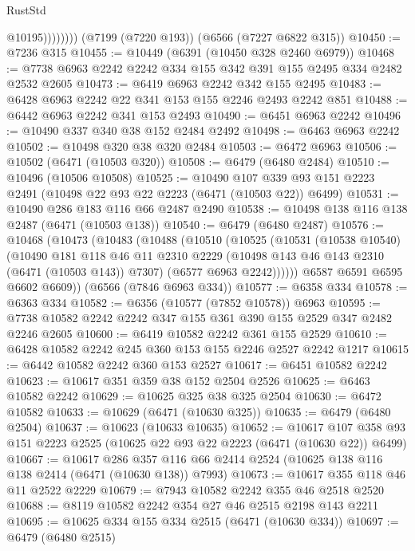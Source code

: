 \begin{lexlean}{RustStd}
\begin{coremodule}
{\begin{coremodule}
{{{{{{{{{{{{{{{{{{{{{{{{{{                    @10195))))))))
    (@7199 (@7220 @193))
    (@6566 (@7227 @6822 @315))
@10450 := @7236 @315
@10455 := @10449 (@6391 (@10450 @328 @2460 @6979))
@10468 := @7738 @6963 @2242 @2242 @334 @155 @342 @391 @155 @2495 @334 @2482 @2532 @2605
@10473 := @6419 @6963 @2242 @342 @155 @2495
@10483 := @6428 @6963 @2242 @22 @341 @153 @155 @2246 @2493 @2242 @851
@10488 := @6442 @6963 @2242 @341 @153 @2493
@10490 := @6451 @6963 @2242
@10496 := @10490 @337 @340 @38 @152 @2484 @2492
@10498 := @6463 @6963 @2242
@10502 := @10498 @320 @38 @320 @2484
@10503 := @6472 @6963
@10506 := @10502 (@6471 (@10503 @320))
@10508 := @6479 (@6480 @2484)
@10510 := @10496 (@10506 @10508)
@10525 := @10490
    @107
    @339
    @93
    @151
    @2223
    @2491
    (@10498 @22 @93 @22 @2223 (@6471 (@10503 @22)) @6499)
@10531 := @10490 @286 @183 @116 @66 @2487 @2490
@10538 := @10498 @138 @116 @138 @2487 (@6471 (@10503 @138))
@10540 := @6479 (@6480 @2487)
@10576 := @10468
    (@10473
      (@10483
        (@10488
          (@10510
            (@10525
              (@10531
                (@10538 @10540)
                (@10490
                  @181
                  @118
                  @46
                  @11
                  @2310
                  @2229
                  (@10498 @143 @46 @143 @2310 (@6471 (@10503 @143)) @7307)
                  (@6577 @6963 @2242))))))
        @6587
        @6591
        @6595
        @6602
        @6609))
    (@6566 (@7846 @6963 @334))
@10577 := @6358 @334
@10578 := @6363 @334
@10582 := @6356 (@10577 (@7852 @10578)) @6963
@10595 := @7738 @10582 @2242 @2242 @347 @155 @361 @390 @155 @2529 @347 @2482 @2246 @2605
@10600 := @6419 @10582 @2242 @361 @155 @2529
@10610 := @6428 @10582 @2242 @245 @360 @153 @155 @2246 @2527 @2242 @1217
@10615 := @6442 @10582 @2242 @360 @153 @2527
@10617 := @6451 @10582 @2242
@10623 := @10617 @351 @359 @38 @152 @2504 @2526
@10625 := @6463 @10582 @2242
@10629 := @10625 @325 @38 @325 @2504
@10630 := @6472 @10582
@10633 := @10629 (@6471 (@10630 @325))
@10635 := @6479 (@6480 @2504)
@10637 := @10623 (@10633 @10635)
@10652 := @10617
    @107
    @358
    @93
    @151
    @2223
    @2525
    (@10625 @22 @93 @22 @2223 (@6471 (@10630 @22)) @6499)
@10667 := @10617
    @286
    @357
    @116
    @66
    @2414
    @2524
    (@10625 @138 @116 @138 @2414 (@6471 (@10630 @138)) @7993)
@10673 := @10617 @355 @118 @46 @11 @2522 @2229
@10679 := @7943 @10582 @2242 @355 @46 @2518 @2520
@10688 := @8119 @10582 @2242 @354 @27 @46 @2515 @2198 @143 @2211
@10695 := @10625 @334 @155 @334 @2515 (@6471 (@10630 @334))
@10697 := @6479 (@6480 @2515)
}}}}}}}}}}}}}}}}}}}}}}}}}}
\end{coremodule}}
\end{coremodule}
\end{lexlean}
